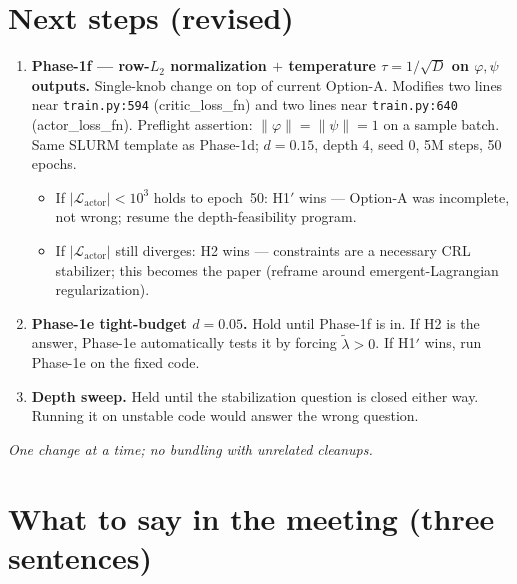 \documentclass[11pt]{article}
\newcommand{\lamt}{\tilde{\lambda}}
\newcommand{\Ltext}[1]{\mathcal{L}_{\text{#1}}}
\begin{document}
\section{Next steps (revised)}
\label{sec:next}

\begin{enumerate}[leftmargin=1.6em,itemsep=3pt,topsep=1pt]
\item \textbf{Phase-1f --- row-$L_2$ normalization $+$ temperature
$\tau=1/\sqrt{D}$ on $\varphi,\psi$ outputs.}
Single-knob change on top of current Option-A. Modifies two lines near
\texttt{train.py:594} (critic\_loss\_fn) and two lines near
\texttt{train.py:640} (actor\_loss\_fn). Preflight assertion:
$\|\varphi\|=\|\psi\|=1$ on a sample batch. Same SLURM template as
Phase-1d; $d=0.15$, depth 4, seed 0, 5M steps, 50 epochs.
\begin{itemize}[leftmargin=1.4em,itemsep=1pt,topsep=2pt]
\item If $|\Ltext{actor}|<10^{3}$ holds to epoch~50: H1$'$ wins --- Option-A
was incomplete, not wrong; resume the depth-feasibility program.
\item If $|\Ltext{actor}|$ still diverges: H2 wins --- constraints are a
necessary CRL stabilizer; this becomes the paper
(reframe around emergent-Lagrangian regularization).
\end{itemize}
\item \textbf{Phase-1e tight-budget $d=0.05$.}
Hold until Phase-1f is in. If H2 is the answer, Phase-1e automatically
tests it by forcing $\lamt>0$. If H1$'$ wins, run Phase-1e on the fixed
code.
\item \textbf{Depth sweep.}
Held until the stabilization question is closed either way. Running it on
unstable code would answer the wrong question.
\end{enumerate}

\noindent\emph{One change at a time; no bundling with unrelated cleanups.}

\section*{What to say in the meeting (three sentences)}
\end{document}
